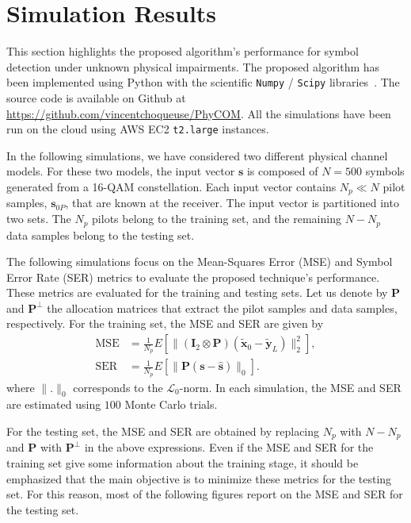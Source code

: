 \documentclass{article}
\begin{document}
\section{Simulation Results}
\label{simu}


This section highlights the proposed algorithm's performance for symbol detection under unknown physical impairments. The proposed algorithm has been implemented using Python with the scientific \texttt{Numpy} / \texttt{Scipy} libraries~\cite{HAR20,VIR20}. The source code is available on Github at \url{https://github.com/vincentchoqueuse/PhyCOM}. All the simulations have been run on the cloud using AWS EC2 \texttt{t2.large} instances. 

In the following simulations, we have considered two different physical channel models. For these two models, the input vector $\mathbf{s}$ is composed of $N=500$ symbols generated from a 16-QAM constellation. Each input vector contains $N_p\ll N$ pilot samples, $\mathbf{s}_{0P}$, that are known at the receiver. The input vector is partitioned into two sets. The $N_p$ pilots belong to the training set, and the remaining $N-N_p$ data samples belong to the testing set.

The following simulations focus on the Mean-Squares Error (MSE) and Symbol Error Rate (SER) metrics to evaluate the proposed technique's performance. These metrics are evaluated for the training and testing sets. Let us denote by $\mathbf{P}$ and $\mathbf{P}^{\perp}$ the allocation matrices that extract the pilot samples and data samples, respectively. For the training set, the MSE and SER are given by
\begin{align}
\text{MSE}&=\frac{1}{N_p}E[\| (\mathbf{I}_2\otimes \mathbf{P}) \left(\tilde{\mathbf{x}}_{0} -\tilde{\mathbf{y}}_{L}\right)\|^2_2],\\
\text{SER}&=\frac{1}{N_p}E[\|  \mathbf{P}\left(\mathbf{s} -\widehat{\mathbf{s}} \right)\|_0].
\end{align}
where $\|.\|_0$ corresponds to the $\mathcal{L}_0$-norm. In each simulation, the MSE and SER are estimated using $100$ Monte Carlo trials. 

For the testing set, the MSE and SER are obtained by replacing $N_p$ with $N-N_p$ and $\mathbf{P} $ with $\mathbf{P}^{\perp}$ in the above expressions. Even if the MSE and SER for the training set give some information about the training stage, it should be emphasized that the main objective is to minimize these metrics for the testing set. For this reason, most of the following figures report on the MSE and SER for the testing set.
\end{document}
